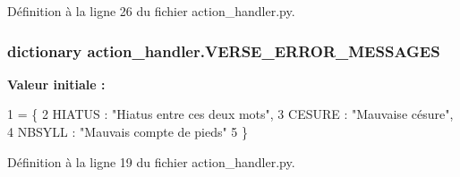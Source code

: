 Définition à la ligne 26 du fichier action\+\_\+handler.\+py.

\hypertarget{namespaceaction__handler_a2d1bf0337f04682fe9609ea8e8b17062}{}
\subsubsection[{V\+E\+R\+S\+E\+\_\+\+E\+R\+R\+O\+R\+\_\+\+M\+E\+S\+S\+A\+G\+E\+S}]{\setlength{\rightskip}{0pt plus 5cm}dictionary action\+\_\+handler.\+V\+E\+R\+S\+E\+\_\+\+E\+R\+R\+O\+R\+\_\+\+M\+E\+S\+S\+A\+G\+E\+S}\label{namespaceaction__handler_a2d1bf0337f04682fe9609ea8e8b17062}
{\bfseries Valeur initiale \+:}
\begin{DoxyCode}
1 = \{
2 HIATUS : \textcolor{stringliteral}{"Hiatus entre ces deux mots"},
3 CESURE : \textcolor{stringliteral}{"Mauvaise césure"},
4 NBSYLL : \textcolor{stringliteral}{"Mauvais compte de pieds"}
5 \}
\end{DoxyCode}


Définition à la ligne 19 du fichier action\+\_\+handler.\+py.

